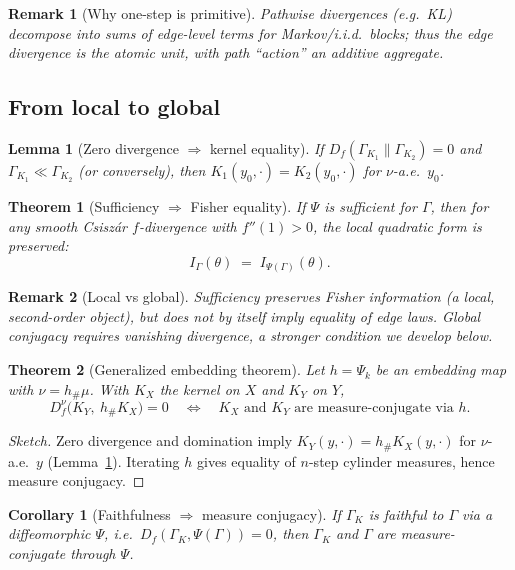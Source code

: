 \documentclass[11pt]{article}
\newtheorem{lemma}{Lemma}
\newtheorem{theorem}{Theorem}
\newtheorem{remark}{Remark}
\newtheorem{corollary}{Corollary}
\newcommand{\1}{\mathbf{1}}
\newcommand{\push}{\#}
\begin{document}
\begin{remark}[Why one-step is primitive]
Pathwise divergences (e.g.\ KL) decompose into sums of edge-level terms for Markov/i.i.d.\ blocks; 
thus the edge divergence is the atomic unit, with path ``action'' an additive aggregate.
\end{remark}

\subsection{From local to global}
\begin{lemma}[Zero divergence $\Rightarrow$ kernel equality]\label{lem:zero}
If $D_f(\Gamma_{K_1}\|\Gamma_{K_2})=0$ and $\Gamma_{K_1}\ll \Gamma_{K_2}$ (or conversely), 
then $K_1(y_0,\cdot)=K_2(y_0,\cdot)$ for $\nu$-a.e.\ $y_0$.
\end{lemma}

\begin{theorem}[Sufficiency $\Rightarrow$ Fisher equality]\label{thm:fisher}
If $\Psi$ is sufficient for $\Gamma$, then for any smooth Csiszár $f$-divergence with $f''(1)>0$, 
the local quadratic form is preserved:
\[
I_{\Gamma}(\theta) \;=\; I_{\Psi(\Gamma)}(\theta).
\]
\end{theorem}

\begin{remark}[Local vs global]
Sufficiency preserves Fisher information (a local, second-order object), 
but does not by itself imply equality of edge laws. 
Global conjugacy requires vanishing divergence, a stronger condition we develop below.
\end{remark}

\begin{theorem}[Generalized embedding theorem]\label{thm:bicond}
Let $h=\Psi_k$ be an embedding map with $\nu=h_\push\mu$. With $K_X$ the kernel on $X$ and $K_Y$ on $Y$,
\[
D_f^{\nu}\!\big(K_Y,\ h_\push K_X\big)=0
\quad\Longleftrightarrow\quad
\text{$K_X$ and $K_Y$ are measure-conjugate via $h$}.
\]
\end{theorem}
\begin{proof}[Sketch]
Zero divergence and domination imply $K_Y(y,\cdot)=h_\push K_X(y,\cdot)$ for $\nu$-a.e.\ $y$ (Lemma~\ref{lem:zero}). 
Iterating $h$ gives equality of $n$-step cylinder measures, hence measure conjugacy.
\end{proof}

\begin{corollary}[Faithfulness $\Rightarrow$ measure conjugacy]
If $\Gamma_K$ is faithful to $\Gamma$ via a diffeomorphic $\Psi$, i.e.\ $D_f(\Gamma_K,\Psi(\Gamma))=0$, 
then $\Gamma_K$ and $\Gamma$ are measure-conjugate through $\Psi$.
\end{corollary}
\end{document}
